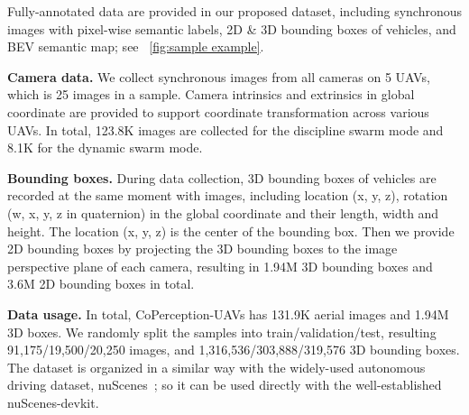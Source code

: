 Fully-annotated data are provided in our proposed dataset, including synchronous images with pixel-wise semantic labels, 2D \& 3D bounding boxes of vehicles, and BEV semantic map; see ~\ref{fig:sample example}.

\textbf{Camera data.} We collect synchronous images from all cameras on 5 UAVs, which is 25 images in a sample. Camera intrinsics and extrinsics in global coordinate are provided to support coordinate transformation across various UAVs. In total, 123.8K images are collected for the discipline swarm mode and 8.1K for the dynamic swarm mode.

\textbf{Bounding boxes.} During data collection, 3D bounding boxes of vehicles are recorded at the same moment with images, including location (x, y, z), rotation (w, x, y, z in quaternion) in the global coordinate and their length, width and height. The location (x, y, z) is the center of the bounding box. Then we provide 2D bounding boxes by projecting the 3D bounding boxes to the image perspective plane of each camera, resulting in 1.94M 3D bounding boxes and 3.6M 2D bounding boxes in total.

\textbf{Data usage.} In total, CoPerception-UAVs has 131.9K aerial images and 1.94M 3D boxes. We randomly split the samples into train/validation/test, resulting 91,175/19,500/20,250 images, and 1,316,536/303,888/319,576 3D bounding boxes. The dataset is organized in a similar way with the widely-used autonomous driving dataset, nuScenes~\cite{nuscenes2019}; so it can be used directly with the well-established nuScenes-devkit.






